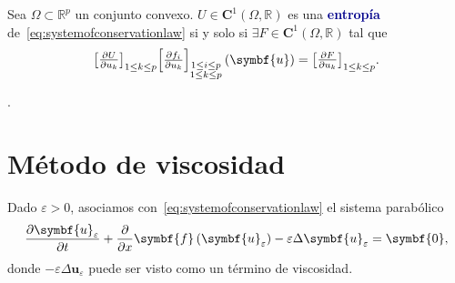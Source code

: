 \begin{definition}
	Sea $\Omega\subset\mathbb{R}^{p}$ un conjunto convexo.
	$U\in\symbf{C}^{1}\left(\Omega,\mathbb{R}\right)$ es una
	\textcolor{DarkBlue}{\bfseries entropía}
	de~\eqref{eq:systemofconservationlaw} si y solo si
	$\exists F\in\symbf{C}^{1}\left(\Omega,\mathbb{R}\right)$ tal que
	\begin{equation*}
		{\begin{bmatrix}
				\diffp{U}{u_{k}}
			\end{bmatrix}}_{1\leq k\leq p}
		{\begin{bmatrix}
				\diffp{f_{i}}{u_{k}}
			\end{bmatrix}}_{\substack{1\leq i\leq p\\1\leq k\leq p}}
		\left(\symbf{u}\right)=
		{\begin{bmatrix}
			\diffp{F}{u_{k}}
		\end{bmatrix}}_{1\leq k\leq p}.
	\end{equation*}
\end{definition}

\begin{example}[$p$-sistema]
	.
\end{example}

\section{Método de viscosidad}

Dado $\varepsilon>0$, asociamos
con~\eqref{eq:systemofconservationlaw} el sistema parabólico
\begin{equation}\label{eq:parabolicsystemofconservationlaw}
	\diffp{\symbf{u}_{\varepsilon}}{t}+
	\diffp{}{x}
	\symbf{f}
	\left(\symbf{u}_{\varepsilon}\right)-
	\varepsilon
	\Delta\symbf{u}_{\varepsilon}=
	\symbf{0},
\end{equation}
donde $-\varepsilon\Delta\symbf{u}_{\varepsilon}$ puede ser visto
como un término de viscosidad.

